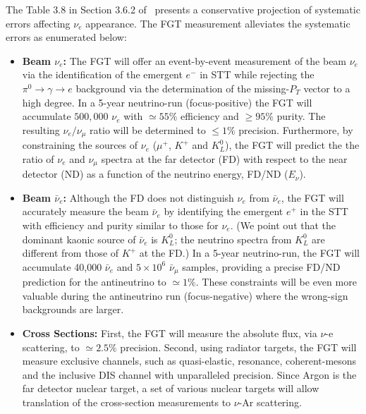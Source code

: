 The Table 3.8   %
in Section 3.6.2 of~\cite{cdr-vol-2}
presents a conservative projection of systematic errors affecting
$\nu_e$ appearance. The FGT measurement alleviates the systematic
errors as enumerated below:
\begin{itemize}
    \item {\bf Beam $\nu_e$:} The FGT will offer an event-by-event
      measurement of the beam $\nu_e$ via the identification of the
      emergent $e^-$ in STT while rejecting the $\pi^0 \rightarrow
      \gamma \rightarrow e$ background via the determination of the
      missing-$P_T$ vector to a high degree.  In a 5-year neutrino-run
      (focus-positive) the FGT will accumulate $500,000$ $\nu_e$
      with $\simeq 55\%$ efficiency and $\geq 95\%$ purity.
      The resulting $\nu_e / \nu_\mu$ ratio will be determined to
      $\leq 1\%$ precision. Furthermore, by constraining the sources
      of $\nu_e$ ($\mu^+$, $K^+$ and $K^0_L$), the FGT will predict
      the the ratio of $\nu_e$ and $\nu_\mu$ spectra at the far
      detector (FD) with respect to the near detector (ND) as a
      function of the neutrino energy, FD/ND ($E_\nu$).

    \item {\bf Beam $\bar\nu_e$:} Although the FD does not distinguish
      $\nu_e$ from $\bar\nu_e$, the FGT will accurately measure the
      beam $\bar\nu_e$ by identifying the emergent $e^+$ in the STT
      with efficiency and purity similar to those for $\nu_e$.  (We
      point out that the dominant kaonic source of $\bar\nu_e$ is
      $K^0_L$; the neutrino spectra from $K^0_L$ are different from
      those of $K^+$ at the FD.)  In a 5-year neutrino-run, the FGT
      will accumulate 40,000 $\bar\nu_e$ and $5\times 10^6$
      $\bar\nu_\mu$ samples, providing a precise FD/ND prediction for
      the antineutrino to $\simeq 1\%$.  These constraints will be
      even more valuable during the antineutrino run (focus-negative)
      where the wrong-sign backgrounds are larger.

    \item {\bf Cross Sections:} First, the FGT will 
      measure the absolute flux, via $\nu$-e scattering,
      to $\simeq 2.5\%$ precision. Second, using radiator targets,
      the FGT will measure exclusive channels, such as
      quasi-elastic, resonance, coherent-mesons and the inclusive DIS
      channel with unparalleled precision. Since Argon is the
      far detector nuclear target, a set of various nuclear targets will
      allow translation of the cross-section measurements to $\nu$-Ar
      scattering.


\end{itemize}
